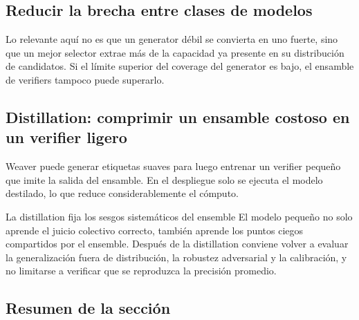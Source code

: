 \documentclass[a4paper]{article}
\begin{document}

\subsection{Reducir la brecha entre clases de modelos}


Lo relevante aquí no es que un generator débil se convierta en uno fuerte, sino que un mejor selector extrae más de la capacidad ya presente en su distribución de candidatos. Si el límite superior del coverage del generator es bajo, el ensamble de verifiers tampoco puede superarlo.

\subsection{Distillation: comprimir un ensamble costoso en un verifier ligero}

Weaver puede generar etiquetas suaves para luego entrenar un verifier pequeño que imite la salida del ensamble. En el despliegue solo se ejecuta el modelo destilado, lo que reduce considerablemente el cómputo.



\begin{warningbox}{La distillation fija los sesgos sistemáticos del ensemble}
El modelo pequeño no solo aprende el juicio colectivo correcto, también aprende los puntos ciegos compartidos por el ensemble. Después de la distillation conviene volver a evaluar la generalización fuera de distribución, la robustez adversarial y la calibración, y no limitarse a verificar que se reproduzca la precisión promedio.
\end{warningbox}

\subsection{Resumen de la sección}
\end{document}
